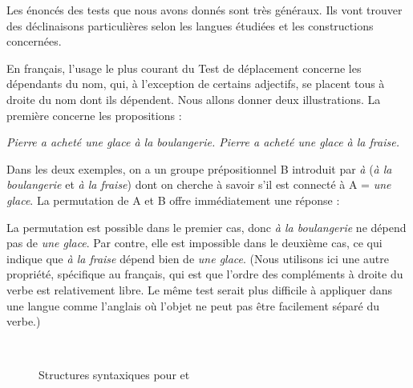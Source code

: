 Les énoncés des tests que nous avons donnés sont très généraux. Ils vont trouver des déclinaisons particulières selon les langues étudiées et les constructions concernées.

En français, l’usage le plus courant du Test de déplacement concerne les dépendants du nom, qui, à l’exception de certains adjectifs, se placent tous à droite du nom dont ils dépendent. Nous allons donner deux illustrations. La première concerne les propositions :

\ea
  \ea \itshape Pierre a acheté une glace à la boulangerie.
  \ex \itshape Pierre a acheté une glace à la fraise.
  \z
\z

Dans les deux exemples, on a un groupe prépositionnel B introduit par \textit{à} (\textit{à la boulangerie} et \textit{à la fraise}) dont on cherche à savoir s’il est connecté à A = \textit{une glace}. La permutation de A et B offre immédiatement une réponse :

\ea
    \label{ex:boulangerie}
    \label{ex:fraise}
    \z
\z

La permutation est possible dans le premier cas, donc \textit{à la boulangerie} ne dépend pas de \textit{une glace}. Par contre, elle est impossible dans le deuxième cas, ce qui indique que \textit{à la fraise} dépend bien de \textit{une glace}. (Nous utilisons ici une autre propriété, spécifique au français, qui est que l’ordre des compléments à droite du verbe est relativement libre. Le même test serait plus difficile à appliquer dans une langue comme l’anglais où l’objet ne peut pas être facilement séparé du verbe.)

\begin{figure}
\medskip\\
\caption{Structures syntaxiques pour  et }
\end{figure}

